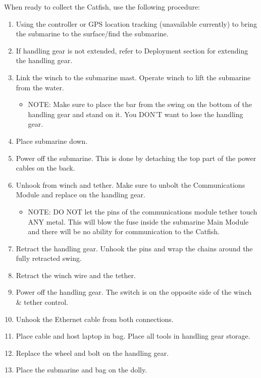 \documentclass[
18pt, %
a4paper, %
oneside, %
headinclude,footinclude, %
]{scrartcl}
\begin{document}
When ready to collect the Catfish, use the following procedure:

\begin{enumerate}
	\item Using the controller or GPS location tracking (unavailable currently) to bring the submarine to the surface/find the submarine.
	\item If handling gear is not extended, refer to Deployment section for extending the handling gear.
	\item Link the winch to the submarine mast. Operate winch to lift the submarine from the water.
		\begin{itemize}
			\item NOTE: Make sure to place the bar from the swing on the bottom of the handling gear and stand on it. You DON'T want to lose the handling gear.
		\end{itemize}
	\item Place submarine down. 
	\item Power off the submarine. This is done by detaching the top part of the power cables on the back.
	\item Unhook from winch and tether. Make sure to unbolt the Communications Module and replace on the handling gear.
		\begin{itemize}
			\item NOTE: DO NOT let the pins of the communications module tether touch ANY metal. This will blow the fuse inside the submarine Main Module and there will be no ability for communication to the Catfish.
		\end{itemize}
	\item Retract the handling gear. Unhook the pins and wrap the chains around the fully retracted swing. 
	\item Retract the winch wire and the tether.
	\item Power off the handling gear. The switch is on the opposite side of the winch \& tether control.
	\item Unhook the Ethernet cable from both connections. 
	\item Place cable and host laptop in bag. Place all tools in handling gear storage.
	\item Replace the wheel and bolt on the handling gear.
	\item Place the submarine and bag on the dolly.
\end{enumerate}

\end{document}
